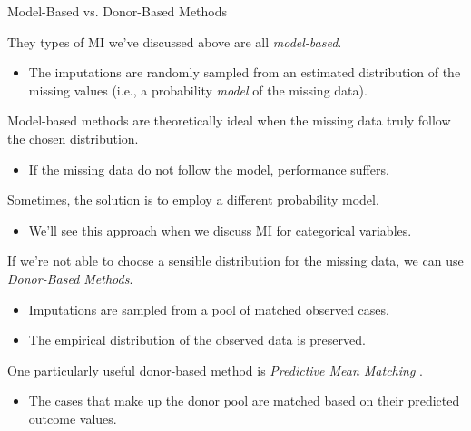 \documentclass{beamer}\usepackage[]{graphicx}\usepackage[]{color}
\begin{document}
\watermarkon %

\begin{frame}[allowframebreaks]{Model-Based vs. Donor-Based Methods}
  
  They types of MI we've discussed above are all \emph{model-based}.
  \vc
  \begin{itemize}
  \item The imputations are randomly sampled from an estimated distribution of 
    the missing values (i.e., a probability \emph{model} of the missing data).
  \end{itemize}
  \vb
  Model-based methods are theoretically ideal when the missing data truly follow 
  the chosen distribution.
  \vc
  \begin{itemize}
  \item If the missing data do not follow the model, performance suffers.
  \end{itemize}
  \vb
  Sometimes, the solution is to employ a different probability model.
  \vc
  \begin{itemize}
  \item We'll see this approach when we discuss MI for categorical variables.
  \end{itemize}
  
  \pagebreak
  
  If we're not able to choose a sensible distribution for the missing data, we 
  can use \emph{Donor-Based Methods}.
  \vc
  \begin{itemize}
  \item Imputations are sampled from a pool of matched observed cases.
    \vc
  \item The empirical distribution of the observed data is preserved.
  \end{itemize}
  \vb
  One particularly useful donor-based method is \emph{Predictive Mean Matching} 
  \citep{little:1988}.
  \begin{itemize}
  \item The cases that make up the donor pool are matched based on their 
    predicted outcome values.
  \end{itemize}
  
\end{frame}

\end{document}
